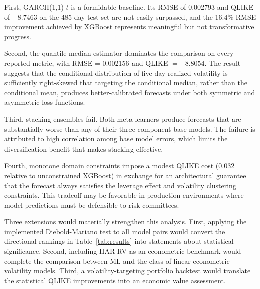 \documentclass[12pt]{article}
\begin{document}
First, GARCH(1,1)-$t$ is a formidable baseline.  Its RMSE of 0.002793 and
QLIKE of $-8.7463$ on the 485-day test set are not easily surpassed, and the
16.4\% RMSE improvement achieved by XGBoost represents meaningful but not
transformative progress.

Second, the quantile median estimator dominates the comparison on every
reported metric, with RMSE = 0.002156 and QLIKE $= -8.8054$.  The result
suggests that the conditional distribution of five-day realized volatility is
sufficiently right-skewed that targeting the conditional median, rather than
the conditional mean, produces better-calibrated forecasts under both symmetric
and asymmetric loss functions.

Third, stacking ensembles fail.  Both meta-learners produce forecasts that are
substantially worse than any of their three component base models.  The failure
is attributed to high correlation among base model errors, which limits the
diversification benefit that makes stacking effective.

Fourth, monotone domain constraints impose a modest QLIKE cost (0.032 relative
to unconstrained XGBoost) in exchange for an architectural guarantee that the
forecast always satisfies the leverage effect and volatility clustering
constraints.  This tradeoff may be favorable in production environments where
model predictions must be defensible to risk committees.

Three extensions would materially strengthen this analysis.  First, applying
the implemented Diebold-Mariano test to all model pairs would convert the
directional rankings in Table~\ref{tab:results} into statements about
statistical significance.  Second, including HAR-RV as an econometric
benchmark would complete the comparison between ML and the class of linear
econometric volatility models.  Third, a volatility-targeting portfolio
backtest would translate the statistical QLIKE improvements into an economic
value assessment.

\newpage




\end{document}
